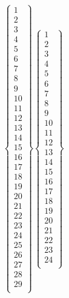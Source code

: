 \documentclass{article}
\begin{document}
\[
  \left\{
    \begin{matrix}
      1\\
      2\\
      3\\
      4\\
      5\\
      6\\
      7\\
      8\\
      9\\
      10\\
      11\\
      12\\
      13\\
      14\\
      15\\
      16\\
      17\\
      18\\
      19\\
      20\\
      21\\
      22\\
      23\\
      24\\
      25\\
      26\\
      27\\
      28\\
      29\\
    \end{matrix}
  \right\}
  \left\{
    \begin{matrix}
      1\\
      2\\
      3\\
      4\\
      5\\
      6\\
      7\\
      8\\
      9\\
      10\\
      11\\
      12\\
      13\\
      14\\
      15\\
      16\\
      17\\
      18\\
      19\\
      20\\
      21\\
      22\\
      23\\
      24\\
    \end{matrix}
  \right\}
\]
\end{document}
